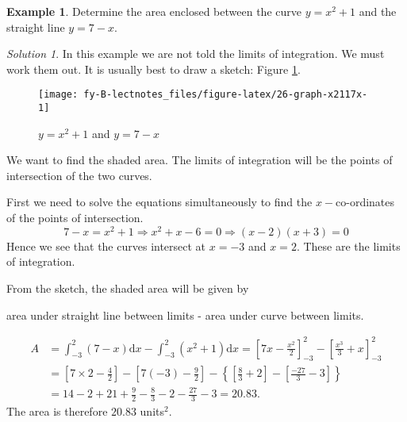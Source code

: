\documentclass[
  11pt,
  oneside]{book}
\newcommand{\slide}{}
\theoremstyle{definition}
\theoremstyle{definition}
\newtheorem{example}{Example}[chapter]
\theoremstyle{definition}
\theoremstyle{definition}
\theoremstyle{remark}
\newtheorem*{solution}{Solution}
\begin{document}
\begin{example}
Determine the area enclosed between the curve \(y=x^2+1\) and the straight line \(y=7-x\).
\end{example}

\begin{solution}
\leavevmode

In this example we are not told the limits of integration. We must work them out. It is usually best to draw a sketch: Figure \ref{fig:26-graph-x2117x}.

\begin{figure}

{\centering \texttt{[image: fy-B-lectnotes\_files/figure-latex/26-graph-x2117x-1]} 

}

\caption{$y=x^2+1$ and $y=7-x$}\label{fig:26-graph-x2117x}
\end{figure}

We want to find the shaded area. The limits of integration will be the points of intersection of the two curves.

First we need to solve the equations simultaneously to find the \(x-\)co-ordinates of the points of intersection.
\[
7-x=x^2+1\Rightarrow x^2+x-6=0\Rightarrow (x-2)(x+3)=0
\]
Hence we see that the curves intersect at \(x=-3\) and \(x=2\). These are the limits of integration.

From the sketch, the shaded area will be given by

\begin{center}
area under straight line between limits - area under curve between limits.
\end{center}

\begin{align*}
A&=\int_{-3}^2(7-x)\mathrm{d}x - \int_{-3}^2(x^2+1)\mathrm{d}x = \left[7x-\frac{x^2}2\right]_{-3}^2 - \left[\frac{x^3}3+x\right]_{-3}^2\\
&=\left[7\times2-\frac{4}2\right]-\left[7(-3)-\frac92\right]-\left\{\left[\frac{8}3+2\right]-\left[\frac{-27}3-3\right]\right\}\\
&=14-2+21+\frac 92-\frac83-2-\frac{27}3-3=20.83.
\end{align*}
The area is therefore \(20.83\) units\(^2\).

\end{solution}

\slide

\begin{slidesonly}

\hbox{}
\slide

\end{slidesonly}
\end{document}
